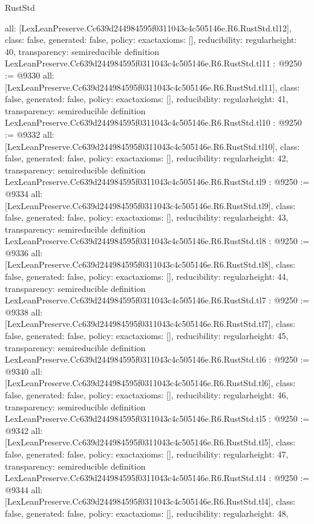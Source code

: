 \begin{lexlean}{RustStd}
\begin{coremodule}
{  all: [LexLeanPreserve.Cc639d244984595f0311043c4c505146e.R6.RustStd.tl12],
  class: false,
  generated: false,
  policy: exact{axioms: []},
  reducibility: regular{height: 40},
  transparency: semireducible
}
definition LexLeanPreserve.Cc639d244984595f0311043c4c505146e.R6.RustStd.tl11 : @9250 := @9330 {
  all: [LexLeanPreserve.Cc639d244984595f0311043c4c505146e.R6.RustStd.tl11],
  class: false,
  generated: false,
  policy: exact{axioms: []},
  reducibility: regular{height: 41},
  transparency: semireducible
}
definition LexLeanPreserve.Cc639d244984595f0311043c4c505146e.R6.RustStd.tl10 : @9250 := @9332 {
  all: [LexLeanPreserve.Cc639d244984595f0311043c4c505146e.R6.RustStd.tl10],
  class: false,
  generated: false,
  policy: exact{axioms: []},
  reducibility: regular{height: 42},
  transparency: semireducible
}
definition LexLeanPreserve.Cc639d244984595f0311043c4c505146e.R6.RustStd.tl9 : @9250 := @9334 {
  all: [LexLeanPreserve.Cc639d244984595f0311043c4c505146e.R6.RustStd.tl9],
  class: false,
  generated: false,
  policy: exact{axioms: []},
  reducibility: regular{height: 43},
  transparency: semireducible
}
definition LexLeanPreserve.Cc639d244984595f0311043c4c505146e.R6.RustStd.tl8 : @9250 := @9336 {
  all: [LexLeanPreserve.Cc639d244984595f0311043c4c505146e.R6.RustStd.tl8],
  class: false,
  generated: false,
  policy: exact{axioms: []},
  reducibility: regular{height: 44},
  transparency: semireducible
}
definition LexLeanPreserve.Cc639d244984595f0311043c4c505146e.R6.RustStd.tl7 : @9250 := @9338 {
  all: [LexLeanPreserve.Cc639d244984595f0311043c4c505146e.R6.RustStd.tl7],
  class: false,
  generated: false,
  policy: exact{axioms: []},
  reducibility: regular{height: 45},
  transparency: semireducible
}
definition LexLeanPreserve.Cc639d244984595f0311043c4c505146e.R6.RustStd.tl6 : @9250 := @9340 {
  all: [LexLeanPreserve.Cc639d244984595f0311043c4c505146e.R6.RustStd.tl6],
  class: false,
  generated: false,
  policy: exact{axioms: []},
  reducibility: regular{height: 46},
  transparency: semireducible
}
definition LexLeanPreserve.Cc639d244984595f0311043c4c505146e.R6.RustStd.tl5 : @9250 := @9342 {
  all: [LexLeanPreserve.Cc639d244984595f0311043c4c505146e.R6.RustStd.tl5],
  class: false,
  generated: false,
  policy: exact{axioms: []},
  reducibility: regular{height: 47},
  transparency: semireducible
}
definition LexLeanPreserve.Cc639d244984595f0311043c4c505146e.R6.RustStd.tl4 : @9250 := @9344 {
  all: [LexLeanPreserve.Cc639d244984595f0311043c4c505146e.R6.RustStd.tl4],
  class: false,
  generated: false,
  policy: exact{axioms: []},
  reducibility: regular{height: 48},
}
\end{coremodule}
\end{lexlean}
